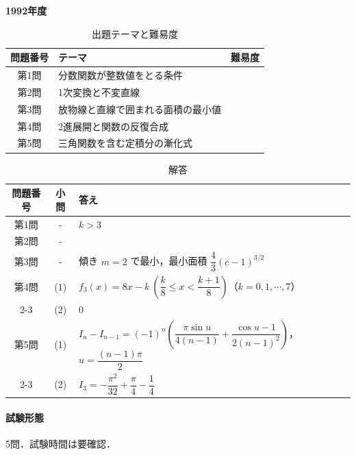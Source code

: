 \documentclass[../../main.tex]{subfiles}
\begin{document}
\begin{center}
  {\fontsize{48pt}{58pt}\selectfont \textbf{1992}\normalsize\textbf{年度}}
\end{center}

\begin{table}[htb]
  \centering
  \caption{出題テーマと難易度}
  \begin{tabular}{|c|p{9cm}|c|}
    \hline
    \textbf{問題番号} & \textbf{テーマ} & \textbf{難易度} \\
    \hline
    第1問 & 分数関数が整数値をとる条件 & \\
    \hline
    第2問 & 1次変換と不変直線 & \\
    \hline
    第3問 & 放物線と直線で囲まれる面積の最小値 & \\
    \hline
    第4問 & 2進展開と関数の反復合成 & \\
    \hline
    第5問 & 三角関数を含む定積分の漸化式 & \\
    \hline
  \end{tabular}
\end{table}

\begin{table}[htb]
  \centering
  \caption{解答}
  \renewcommand{\arraystretch}{1.4}
  \begin{tabular}{|c|c|p{9cm}|}
    \hline
    \textbf{問題番号} & \textbf{小問} & \textbf{答え} \\
    \hline
    第1問 & - & $k>3$ \\
    \hline
    第2問 & - &  \\
    \hline
    第3問 & - & 傾き $m=2$ で最小，最小面積 $\dfrac{4}{3}(c-1)^{3/2}$ \\
    \hline
    第4問 & (1) & $f_3(x)=8x-k\ \left(\dfrac{k}{8}\le x<\dfrac{k+1}{8}\right)$（$k=0,1,\cdots,7$） \\
    \cline{2-3}
    & (2) & $0$ \\
    \hline
    第5問 & (1) & $I_n-I_{n-1}=(-1)^n\left(\dfrac{\pi\sin u}{4(n-1)}+\dfrac{\cos u-1}{2(n-1)^2}\right)$，$u=\dfrac{(n-1)\pi}{2}$ \\
    \cline{2-3}
    & (2) & $I_3=-\dfrac{\pi^2}{32}+\dfrac{\pi}{4}-\dfrac{1}{4}$ \\
    \hline
  \end{tabular}
\end{table}

\paragraph{試験形態}
5問．試験時間は要確認．
\end{document}
